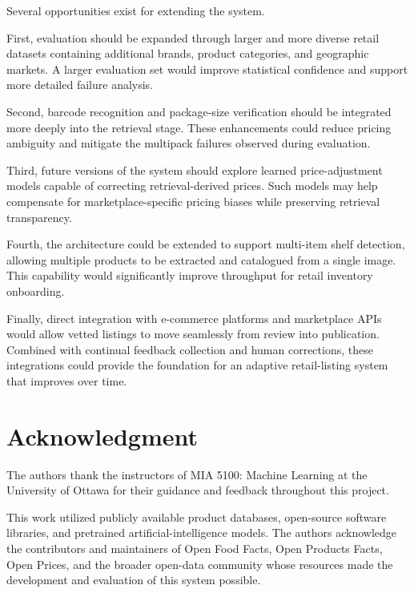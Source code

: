 \documentclass[conference]{IEEEtran}
\begin{document}
Several opportunities exist for extending the system.

First, evaluation should be expanded through larger and more diverse retail
datasets containing additional brands, product categories, and geographic
markets. A larger evaluation set would improve statistical confidence and
support more detailed failure analysis. 

Second, barcode recognition and package-size verification should be
integrated more deeply into the retrieval stage. These enhancements could
reduce pricing ambiguity and mitigate the multipack failures observed
during evaluation. 

Third, future versions of the system should explore learned
price-adjustment models capable of correcting retrieval-derived prices.
Such models may help compensate for marketplace-specific pricing biases
while preserving retrieval transparency. 

Fourth, the architecture could be extended to support multi-item shelf
detection, allowing multiple products to be extracted and catalogued from
a single image. This capability would significantly improve throughput for
retail inventory onboarding. 

Finally, direct integration with e-commerce platforms and marketplace APIs
would allow vetted listings to move seamlessly from review into
publication. Combined with continual feedback collection and human
corrections, these integrations could provide the foundation for an
adaptive retail-listing system that improves over time. 

\section*{Acknowledgment}

The authors thank the instructors of MIA 5100: Machine Learning at the
University of Ottawa for their guidance and feedback throughout this
project.

This work utilized publicly available product databases, open-source
software libraries, and pretrained artificial-intelligence models.
The authors acknowledge the contributors and maintainers of Open Food
Facts, Open Products Facts, Open Prices, and the broader open-data
community whose resources made the development and evaluation of this
system possible.

%
%
%




\end{document}
